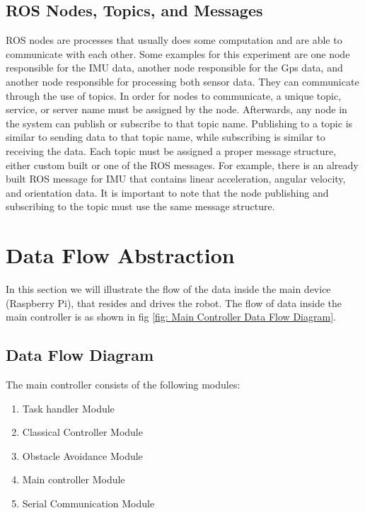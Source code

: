 \subsection{ROS Nodes, Topics, and Messages}
\hspace{2cm}ROS nodes are processes that usually does some computation and are able to
communicate with each other. Some examples for this experiment are one node responsible for the IMU data, another node responsible for the Gps data, and another node responsible for processing both sensor data. They can communicate through the use of topics. In order for nodes to communicate, a unique topic, service, or server name must be assigned by the node. Afterwards, any node in the system can publish or subscribe to that topic name. Publishing to a topic is similar to sending data to that topic name, while subscribing is similar to receiving the data. Each topic must be assigned a proper message structure, either custom built or one of the ROS messages. For example, there is an already built ROS message for IMU that contains linear acceleration, angular velocity, and orientation data. It is important to note that the node publishing and subscribing to the topic must use the same message structure.\cite{web040}

\section{Data Flow Abstraction}
\hspace{2cm}In this section we will illustrate the flow of the data inside the main device (Raspberry Pi), that resides and drives the robot. The flow of data inside the main controller is as shown in fig \ref{fig: Main Controller Data Flow Diagram}.
\subsection{Data Flow Diagram}
\hspace{2cm}The main controller consists of the following modules:
\begin{enumerate}
    \item Task handler Module 
    \item Classical Controller Module
    \item Obstacle Avoidance Module
    \item Main controller Module
    \item Serial Communication Module
\end{enumerate}
